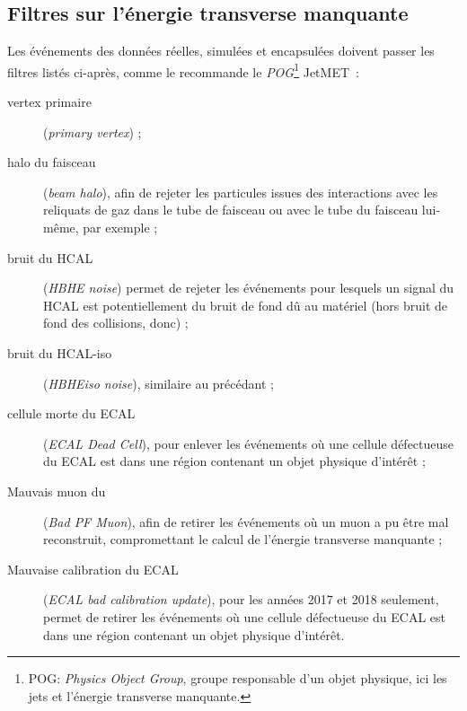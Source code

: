 \subsection{Filtres sur l'énergie transverse manquante}\label{chapter-HTT_analysis-section-MET_filters}
Les événements des données réelles, simulées et encapsulées doivent passer les filtres listés ci-après, comme le recommande le \emph{POG}\footnote{POG: \emph{Physics Object Group}, groupe responsable d'un objet physique, ici les jets et l'énergie transverse manquante.} JetMET~\cite{MET_filters}:
\begin{description}
\item[vertex primaire] (\emph{primary vertex}) ;
\item[halo du faisceau] (\emph{beam halo}), afin de rejeter les particules issues des interactions avec les reliquats de gaz dans le tube de faisceau ou avec le tube du faisceau lui-même, par exemple ;
\item[bruit du HCAL] (\emph{HBHE noise}) permet de rejeter les événements pour lesquels un signal du HCAL est potentiellement du bruit de fond dû au matériel (hors bruit de fond des collisions, donc) ;
\item[bruit du HCAL-iso] (\emph{HBHEiso noise}), similaire au précédant ;
\item[cellule morte du ECAL] (\emph{ECAL Dead Cell}), pour enlever les événements où une cellule défectueuse du ECAL est dans une région contenant un objet physique d'intérêt ;
\item[Mauvais muon du \PF] (\emph{Bad PF Muon}), afin de retirer les événements où un muon a pu être mal reconstruit, compromettant le calcul de l'énergie transverse manquante ;
\item[Mauvaise calibration du ECAL] (\emph{ECAL bad calibration update}), pour les années 2017 et 2018 seulement, permet de retirer les événements où une cellule défectueuse du ECAL est dans une région contenant un objet physique d'intérêt.
\end{description}